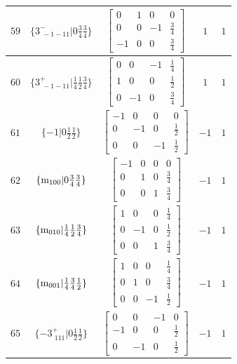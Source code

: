 \documentclass[fleqn,8pt]{jsarticle}
\begin{document}
\begin{longtable}{ccccc}
$ 59 $ & $ \{3^{-}_{\,\,-1-11}|0 \frac{3}{4} \frac{3}{4}\} $ & $ \begin{bmatrix} 0 & 1 & 0 & 0 \\ 0 & 0 & -1 & \frac{3}{4} \\ -1 & 0 & 0 & \frac{3}{4} \end{bmatrix} $ & $ 1 $ & $ 1 $ \\ \hline
$ 60 $ & $ \{3^{+}_{\,\,-1-11}|\frac{1}{4} \frac{1}{2} \frac{3}{4}\} $ & $ \begin{bmatrix} 0 & 0 & -1 & \frac{1}{4} \\ 1 & 0 & 0 & \frac{1}{2} \\ 0 & -1 & 0 & \frac{3}{4} \end{bmatrix} $ & $ 1 $ & $ 1 $ \\ \hline
$ 61 $ & $ \{-1|0 \frac{1}{2} \frac{1}{2}\} $ & $ \begin{bmatrix} -1 & 0 & 0 & 0 \\ 0 & -1 & 0 & \frac{1}{2} \\ 0 & 0 & -1 & \frac{1}{2} \end{bmatrix} $ & $ -1 $ & $ 1 $ \\ \hline
$ 62 $ & $ \{{\rm m}_{100}|0 \frac{3}{4} \frac{3}{4}\} $ & $ \begin{bmatrix} -1 & 0 & 0 & 0 \\ 0 & 1 & 0 & \frac{3}{4} \\ 0 & 0 & 1 & \frac{3}{4} \end{bmatrix} $ & $ -1 $ & $ 1 $ \\ \hline
$ 63 $ & $ \{{\rm m}_{010}|\frac{1}{4} \frac{1}{2} \frac{3}{4}\} $ & $ \begin{bmatrix} 1 & 0 & 0 & \frac{1}{4} \\ 0 & -1 & 0 & \frac{1}{2} \\ 0 & 0 & 1 & \frac{3}{4} \end{bmatrix} $ & $ -1 $ & $ 1 $ \\ \hline
$ 64 $ & $ \{{\rm m}_{001}|\frac{1}{4} \frac{3}{4} \frac{1}{2}\} $ & $ \begin{bmatrix} 1 & 0 & 0 & \frac{1}{4} \\ 0 & 1 & 0 & \frac{3}{4} \\ 0 & 0 & -1 & \frac{1}{2} \end{bmatrix} $ & $ -1 $ & $ 1 $ \\ \hline
$ 65 $ & $ \{-3^{+}_{\,\,111}|0 \frac{1}{2} \frac{1}{2}\} $ & $ \begin{bmatrix} 0 & 0 & -1 & 0 \\ -1 & 0 & 0 & \frac{1}{2} \\ 0 & -1 & 0 & \frac{1}{2} \end{bmatrix} $ & $ -1 $ & $ 1 $ \\ \hline

\end{longtable}
\end{document}
